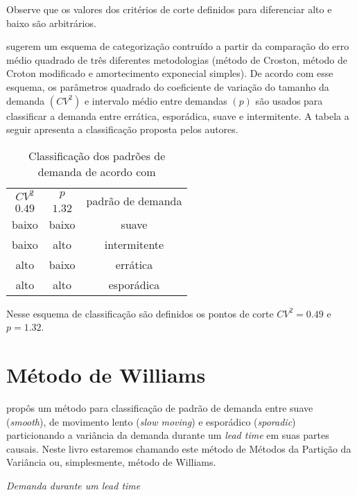 \documentclass{book}
\begin{document}
Observe que os valores dos critérios de corte definidos para diferenciar alto e baixo são arbitrários.

\cite{SyntetosEtAl2005} sugerem um esquema de categorização contruído a partir da comparação do erro médio quadrado de três diferentes metodologias (método de Croston, método de Croton modificado e amortecimento exponecial simples). De acordo com esse esquema, os parâmetros quadrado do coeficiente de variação do tamanho da demanda $(CV^2)$ e intervalo médio entre demandas $(p)$ são usados para classificar a demanda entre errática, esporádica, suave e intermitente. A tabela a seguir apresenta a classificação proposta pelos autores.

\begin{table}[h]
\begin{center}
\begin{tabular}[c]{c c c}
\cline {1-3}
$CV^2$ & $p$ & \multirow{2}{*}{padrão de demanda} \\ 
$0.49$ & $1.32$ & \\ \cline {1-3}
baixo & baixo & suave   \\ 
baixo & alto  & intermitente   \\ 
alto  & baixo & errática   \\
alto  & alto  & esporádica  \\ \cline {1-3}
\end{tabular}
\caption{Classificação dos padrões de demanda de acordo com \cite{SyntetosEtAl2005}}
\label{tab:DemandPatternSybtetos}
\end{center}
\end{table}

Nesse esquema de classificação são definidos os pontos de corte $CV^2=0.49$ e $p=1.32$.

\section{Método de Williams}
\label{sec:williams}

\cite{Williams1984} propôs um método para classificação de padrão de demanda entre suave (\emph{smooth}), de movimento lento (\emph{slow moving}) e esporádico (\emph{sporadic}) particionando a variância da demanda durante um \emph{lead time} em suas partes causais. Neste livro estaremos chamando este método de Métodos da Partição da Variância ou, simplesmente, método de Williams.

\emph{Demanda durante um lead time}
\end{document}

